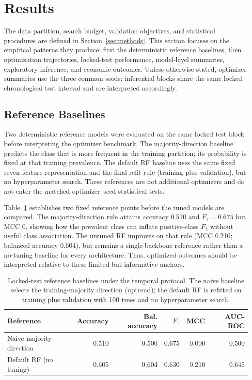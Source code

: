 \section{Results}\label{sec:results}

The data partition, search budget, validation objectives, and statistical procedures are defined in Section~\ref{sec:methods}. This section focuses on the empirical patterns they produce: first the deterministic reference baselines, then optimization trajectories, locked-test performance, model-level summaries, exploratory inference, and economic outcomes. Unless otherwise stated, optimizer summaries use the three common seeds; inferential blocks share the same locked chronological test interval and are interpreted accordingly.

\subsection{Reference Baselines}

Two deterministic reference models were evaluated on the same locked test block before interpreting the optimizer benchmark. The majority-direction baseline predicts the class that is more frequent in the training partition; its probability is fixed at that training prevalence. The default RF baseline uses the same fixed seven-feature representation and the final-refit rule (training plus validation), but no hyperparameter search. These references are not additional optimizers and do not enter the matched optimizer--seed statistical tests.

Table~\ref{tab:reference_baselines} establishes two fixed reference points before the tuned models are compared. The majority-direction rule attains accuracy 0.510 and $F_1=0.675$ but MCC 0, showing how the prevalent class can inflate positive-class $F_1$ without useful class association. The untuned RF improves on that rule (MCC 0.210; balanced accuracy 0.604), but remains a single-backbone reference rather than a no-tuning baseline for every architecture. Thus, optimized outcomes should be interpreted relative to these limited but informative anchors.

\begin{table}[htbp]
\centering
\caption{Locked-test reference baselines under the temporal protocol. The naive baseline selects the training-majority direction (uptrend); the default RF is refitted on training plus validation with 100 trees and no hyperparameter search.}
\label{tab:reference_baselines}
\manuscripttablestyle
\begin{tabular}{lrrrrr}\toprule
\textbf{Reference} & \textbf{Accuracy} & \textbf{Bal. accuracy} & \textbf{$F_1$} & \textbf{MCC} & \textbf{AUC-ROC}\\\midrule
Naive majority direction & 0.510 & 0.500 & 0.675 & 0.000 & 0.500\\
Default RF (no tuning) & 0.605 & 0.604 & 0.630 & 0.210 & 0.645\\\bottomrule
\end{tabular}
\end{table}

